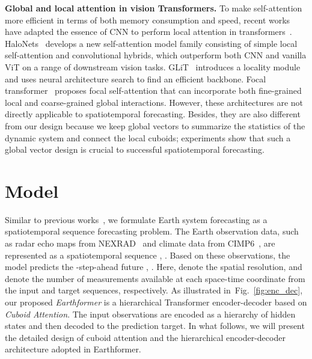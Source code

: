 \documentclass{article}
\newcommand{\figref}[1]{Fig.~\ref{#1}}
\renewcommand{\paragraph}[1]{\textbf{#1. }}
\begin{document}
\paragraph{Global and local attention in vision Transformers}
To make self-attention more efficient in terms of both memory consumption and speed, recent works have adapted the essence of CNN to perform local attention in transformers~\cite{TNT,ying2021transformers}. HaloNets~\cite{vaswani2021scaling} develops a new self-attention model family consisting of simple local self-attention and convolutional hybrids, which outperform both CNN and vanilla ViT on a range of downstream vision tasks. GLiT~\cite{chen2021glit} introduces a locality module and uses neural architecture search to find an efficient backbone. Focal transformer~\cite{yang2021focal} proposes focal self-attention that can incorporate both fine-grained local and coarse-grained global interactions. 
However, these architectures are not directly applicable to spatiotemporal forecasting. Besides, they are also different from our design because we keep  global vectors to summarize the statistics of the dynamic system and connect the local cuboids; experiments show that such a global vector design is crucial to successful spatiotemporal forecasting. 


\section{Model}
\label{sec:model}
Similar to previous works~\cite{shi2015convolutional, veillette2020sevir, bai2022rainformer}, we formulate Earth system forecasting as a spatiotemporal sequence forecasting problem. The Earth observation data, such as radar echo maps from NEXRAD~\cite{heiss1990nexrad} and climate data from CIMP6~\cite{eyring2016overview}, are represented as a spatiotemporal sequence
, . 
Based on these observations, the model predicts the -step-ahead future
, . 
Here,  denote the spatial resolution, and  denote the number of measurements available at each space-time coordinate from the input and target sequences, respectively. As illustrated in~\figref{fig:enc_dec}, our proposed \emph{Earthformer} is a hierarchical Transformer encoder-decoder based on \emph{Cuboid Attention}. The input observations are encoded as a hierarchy of hidden states and then decoded to the prediction target. In what follows, we will present the detailed design of cuboid attention and the hierarchical encoder-decoder architecture adopted in Earthformer.
\end{document}
